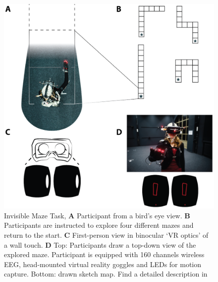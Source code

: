 \begin{figure}[!t]
\centering
    \includegraphics[width=\linewidth]{figures/IMT_Task.png}
    \caption{Invisible Maze Task, \textbf{A} Participant from a bird’s eye view. \textbf{B} Participants are instructed to explore four different mazes and return to the start. \textbf{C} First-person view in binocular `VR optics' of a wall touch. \textbf{D} Top: Participants draw a top-down view of the explored maze. Participant is equipped with 160 channels wireless EEG, head-mounted virtual reality goggles and LEDs for motion capture. Bottom: drawn sketch map. Find a detailed description in \cite{Gehrke2018}}
    \label{imt_task}
\end{figure}